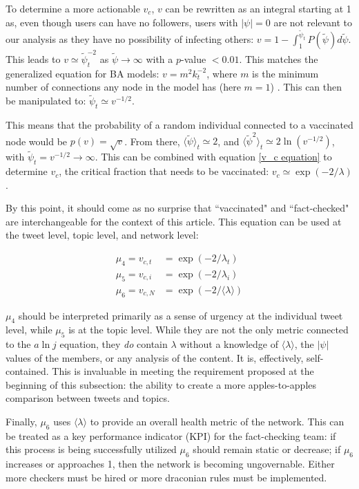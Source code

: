 \documentclass[preprint,review,12pt]{elsarticle}
\begin{document}
To determine a more actionable $v_c$, $v$ can be rewritten as an integral starting at 1 as, even though users can have no followers, users with $|\psi| = 0$ are not relevant to our analysis as they have no possibility of infecting others: $v  = 1 - \int_1^{\tilde{\psi}_{t}} P(\tilde{\psi})d\tilde{\psi}$. This leads to $v \simeq \tilde{\psi}_t^{-2}$ as $\tilde{\psi} \rightarrow \infty$ with a $p$-value $< 0.01$. This matches the generalized equation for BA models: $v = m^2k_t^{-2}$, where $m$ is the minimum number of connections any node in the model has (here $m = 1$) \citep{pastor2001epidemic}. This can then be manipulated to: $\tilde{\psi}_t \simeq v^{-1/2}$. 

This means that the probability of a random individual connected to a vaccinated node would be $p(v) = \sqrt{v}$. From there, $\langle \tilde{\psi} \rangle_t \simeq 2$, and $\langle \tilde{\psi}^2 \rangle_t \simeq 2 \ln(v^{-1/2})$, with $\tilde{\psi}_t = v^{-1/2} \rightarrow \infty$. This can be combined with equation \ref{v_c equation} to determine $v_c$, the critical fraction that needs to be vaccinated: $v_c \simeq \exp{(-2/\lambda)}$.

By this point, it should come as no surprise that ``vaccinated" and ``fact-checked" are interchangeable for the context of this article. This equation can be used at the tweet level, topic level, and network level:

\begin{equation}
\label{mu_4 and mu_5}
\begin{split}
    \mu_4 = v_{c,t} & = \exp(-2/\lambda_{t}) \\
    \mu_5 = v_{c,i} & = \exp(-2/\lambda_{i}) \\
    \mu_6 = v_{c,N} & = \exp(-2/\langle \lambda \rangle)
\end{split}
\end{equation}

$\mu_4$ should be interpreted primarily as a sense of urgency at the individual tweet level, while $\mu_5$ is at the topic level. While they are not the only metric connected to the $a \ln j$ equation, they \textit{do} contain $\lambda$ without a knowledge of $\langle \lambda \rangle$, the $|\psi|$ values of the members, or any analysis of the content. It is, effectively, self-contained. This is invaluable in meeting the requirement proposed at the beginning of this subsection: the ability to create a more apples-to-apples comparison between tweets and topics. 

Finally, $\mu_6$ uses $\langle \lambda \rangle$ to provide an overall health metric of the network. This can be treated as a key performance indicator (KPI) for the fact-checking team: if this process is being successfully utilized $\mu_6$ should remain static or decrease; if $\mu_6$ increases or approaches 1, then the network is becoming ungovernable. Either more checkers must be hired or more draconian rules must be implemented.
\end{document}
